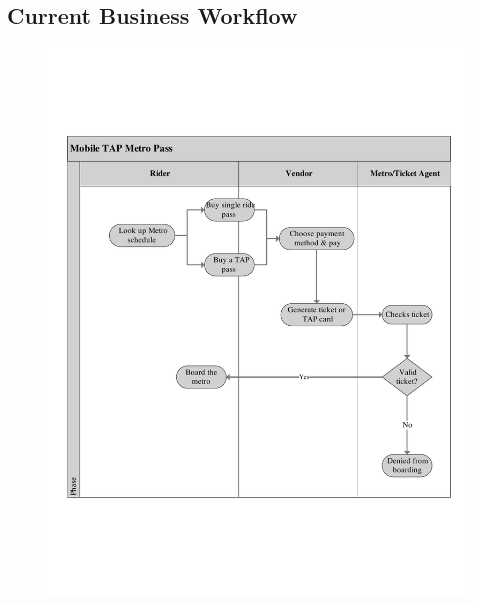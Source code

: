 \subsection{Current Business Workflow}
\begin{figure}[h]
\centering
\includegraphics[scale=.5]{CIR/uml.pdf}
\end{figure}